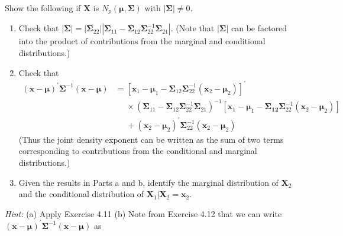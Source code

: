 Show the following if $\textbf{X}$ is $N_p(\bm{\mu}, \bm{\Sigma})$ with $\left|\bm{\Sigma}\right| \ne 0$.
\begin{enumerate}[label=(\alph*)]
    \item Check that $\left|\bm{\Sigma}\right| = \left|\bm{\Sigma}_{22}\right|\left|\bm{\Sigma}_{11} - \bm{\Sigma}_{12}\bm{\Sigma}_{22}^{-1}\bm{\Sigma}_{21}\right|$. (Note that $\left|\bm{\Sigma}\right|$ can be factored into the product of contributions from the marginal and conditional distributions.)
    \item Check that
    \begin{equation*}
        \begin{aligned}
            {\left(\textbf{x} - \bm{\mu}\right)}^{\prime}\bm{\Sigma}^{-1}\left(\textbf{x} - \bm{\mu}\right)
            & =
            {[\textbf{x}_{1} - \bm{\mu}_{1} - \bm{\Sigma}_{12}\bm{\Sigma}_{22}^{-1}(\textbf{x}_{2} - \bm{\mu}_{2})]}^{\prime} \\
            & \phantom{=}\times {(\bm{\Sigma}_{11} - \bm{\Sigma}_{12}\bm{\Sigma}_{22}^{-1}\bm{\Sigma}_{21})}^{-1}[\textbf{x}_{1} - \bm{\mu}_{1} - \bm{\Sigma_{12}}\bm{\Sigma}_{22}^{-1}(\textbf{x}_2 - \bm{\mu}_{2})]\\
            & \phantom{=}+{(\textbf{x}_{2} - \bm{\mu}_{2})}^{\prime}\bm{\Sigma}_{22}^{-1}(\textbf{x}_{2} - \bm{\mu}_{2})
        \end{aligned} 
    \end{equation*}
    (Thus the joint density exponent can be written as the sum of two terms corresponding to contributions from the conditional and marginal distributions.)
    \item Given the results in Parts a and b, identify the marginal distribution of $\textbf{X}_{2}$ and the conditional distribution of $\textbf{X}_{1} \big| \textbf{X}_{2} = \textbf{x}_{2}$.
\end{enumerate}
\textit{Hint:}
\newline
(a) Apply Exercise 4.11
\newline
(b) Note from Exercise 4.12 that we can write ${\left(\textbf{x} - \bm{\mu}\right)}^{\prime}\bm{\Sigma}^{-1}\left(\textbf{x} - \bm{\mu}\right)$ as
